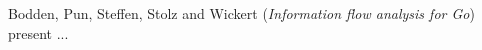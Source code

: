

Bodden, Pun, Steffen, Stolz and Wickert
\cite{isola-2016-bodden}
({\em Information flow analysis for Go})
present ...

